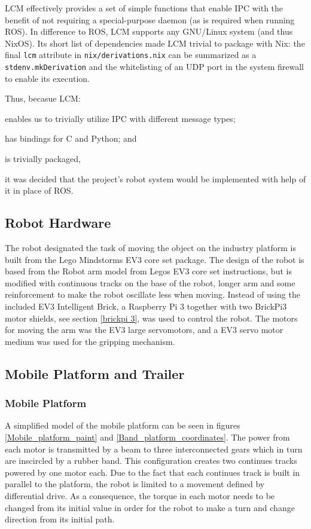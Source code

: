 LCM effectively provides a set of simple functions that enable IPC with the benefit of not requiring a special-purpose daemon (as is required when running ROS).
In difference to ROS, LCM supports any GNU/Linux system (and thus NixOS).
Its short list of dependencies made LCM trivial to package with Nix:
the final \texttt{lcm} attribute in \texttt{nix/derivations.nix} can be summarized as a \texttt{stdenv.mkDerivation} and the whitelisting of an UDP port in the system firewall to enable its execution.

Thus, becasue LCM:
\begin{inline-enum}
\item enables us to trivially utilize IPC with different message types;
\item has bindings for C and Python; and
\item is trivially packaged,
\end{inline-enum}
it was decided that the project's robot system would be implemented with help of it in place of ROS.

\subsection{Robot Hardware}
The robot designated the task of moving the object on the industry platform is built from the Lego Mindstorms EV3 core set package. The design of the robot is based from the Robot arm model from Legos EV3 core set instructions, but is modified with continuous tracks on the base of the robot, longer arm and some reinforcement to make the robot oscillate less when moving. Instead of using the included EV3 Intelligent Brick, a Raspberry Pi 3 together with two BrickPi3 motor shields, see section \ref{brickpi 3}, was used to control the robot. The motors for moving the arm was the EV3 large servomotors, and a EV3 servo motor medium was used for the gripping mechanism.


\newpage
\subsection {Mobile Platform and Trailer}
\subsubsection{Mobile Platform}
A simplified model of the mobile platform can be seen in figures \ref{Mobile_platform_paint} and \ref{Band_platform_coordinates}. The power from each motor is transmitted by a beam to three interconnected gears which in turn are inscircled by a rubber band. This configuration  creates two continues tracks powered by one motor each. Due to the fact that each continues track is built in parallel to the platform, the robot is limited to a movement defined by differential drive. As a consequence, the torque in each motor needs to be changed from its initial value in order for the robot to make a turn and change direction from its initial path. 



